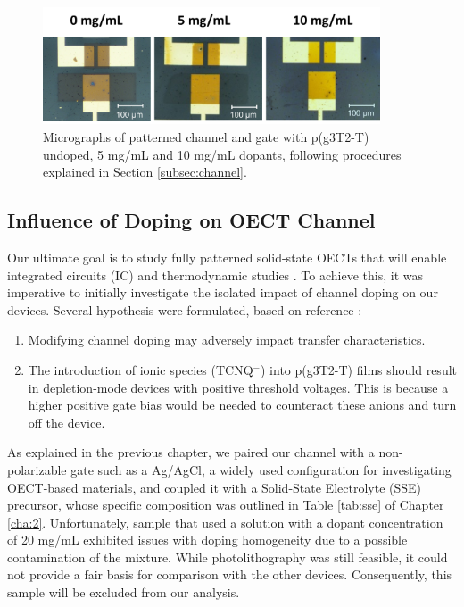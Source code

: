 \begin{figure}[ht]
  \centering
  \includegraphics[width=10cm]{Images/pdf/BigGateDevices.pdf}
  \caption[Micrographs of a patterned channel and gate p(g3T2-T) at different doping levels]{Micrographs of patterned channel and gate with p(g3T2-T) undoped, 5 mg/mL and 10 mg/mL dopants, following procedures explained in Section \ref{subsec:channel}.}
  \label{fig:channel}
\end{figure}


\subsection{Influence of Doping on OECT Channel}
Our ultimate goal is to study fully patterned solid-state OECTs that will enable integrated circuits (IC) and thermodynamic studies \cite{cucchiThermodynamicsOrganicElectrochemical2022}. To achieve this, it was imperative to initially investigate the isolated impact of channel doping on our devices. Several hypothesis were formulated, based on reference \cite{tanTuningOrganicElectrochemical2022}:

\begin{enumerate}
\item Modifying channel doping may adversely impact transfer characteristics.
\item The introduction of ionic species (TCNQ$^{-}$) into p(g3T2-T) films should result in depletion-mode devices with positive threshold voltages. This is because a higher positive gate bias would be needed to counteract these anions and turn off the device.
\end{enumerate}

As explained in the previous chapter, we paired our channel with a non-polarizable gate such as a Ag/AgCl, a widely used configuration for investigating OECT-based materials, and coupled it with a Solid-State Electrolyte (SSE) precursor, whose specific composition was outlined in Table \ref{tab:sse} of Chapter \ref{cha:2}. Unfortunately, sample that used a solution with a dopant concentration of 20 mg/mL exhibited issues with doping homogeneity due to a possible contamination of the mixture. While photolithography was still feasible, it could not provide a fair basis for comparison with the other devices. Consequently, this sample will be excluded from our analysis.


